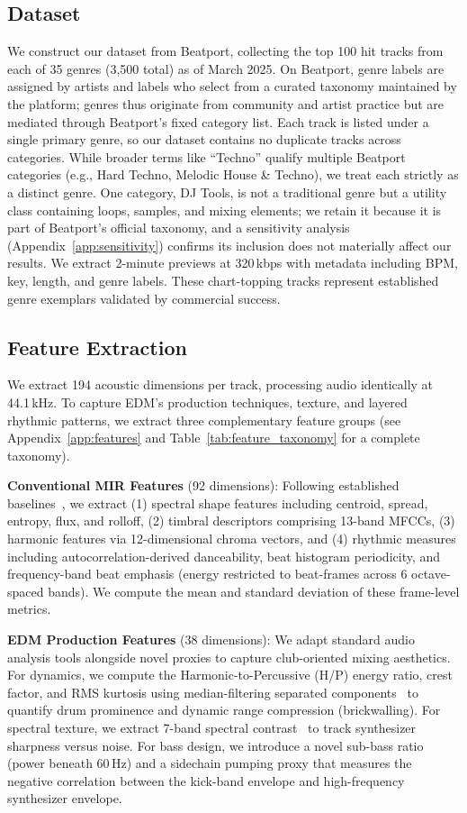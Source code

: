 \documentclass{article}
\begin{document}
	\subsection{Dataset}\label{ssec:dataset}
	We construct our dataset from Beatport, collecting the top 100 hit tracks from each of 35 genres (3,500 total) as of March 2025. On Beatport, genre labels are assigned by artists and labels who select from a curated taxonomy maintained by the platform; genres thus originate from community and artist practice but are mediated through Beatport's fixed category list. Each track is listed under a single primary genre, so our dataset contains no duplicate tracks across categories. While broader terms like ``Techno'' qualify multiple Beatport categories (e.g., Hard Techno, Melodic House \& Techno), we treat each strictly as a distinct genre. One category, DJ Tools, is not a traditional genre but a utility class containing loops, samples, and mixing elements; we retain it because it is part of Beatport's official taxonomy, and a sensitivity analysis (Appendix~\ref{app:sensitivity}) confirms its inclusion does not materially affect our results. We extract 2-minute previews at 320\,kbps with metadata including BPM, key, length, and genre labels. These chart-topping tracks represent established genre exemplars validated by commercial success.

	\subsection{Feature Extraction}\label{ssec:features}
	We extract 194 acoustic dimensions per track, processing audio identically at 44.1\,kHz. To capture EDM's production techniques, texture, and layered rhythmic patterns, we extract three complementary feature groups (see Appendix~\ref{app:features} and Table~\ref{tab:feature_taxonomy} for a complete taxonomy).

	\textbf{Conventional MIR Features} (92 dimensions): Following established baselines~\cite{caparrini2020}, we extract (1) spectral shape features including centroid, spread, entropy, flux, and rolloff, (2) timbral descriptors comprising 13-band MFCCs, (3) harmonic features via 12-dimensional chroma vectors, and (4) rhythmic measures including autocorrelation-derived danceability, beat histogram periodicity, and frequency-band beat emphasis (energy restricted to beat-frames across 6 octave-spaced bands). We compute the mean and standard deviation of these frame-level metrics.
	
	\textbf{EDM Production Features} (38 dimensions): We adapt standard audio analysis tools alongside novel proxies to capture club-oriented mixing aesthetics. For dynamics, we compute the Harmonic-to-Percussive (H/P) energy ratio, crest factor, and RMS kurtosis using median-filtering separated components~\cite{fitzgerald2010} to quantify drum prominence and dynamic range compression (brickwalling). For spectral texture, we extract 7-band spectral contrast~\cite{jiang2002} to track synthesizer sharpness versus noise. For bass design, we introduce a novel sub-bass ratio (power beneath 60\,Hz) and a sidechain pumping proxy that measures the negative correlation between the kick-band envelope and high-frequency synthesizer envelope.
\end{document}
